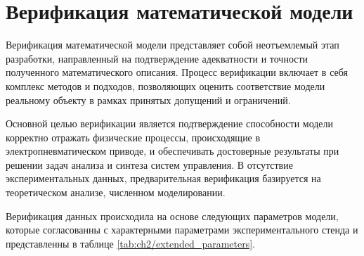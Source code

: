 
\section{Верификация математической модели}\label{sec:ch2/sec6}
Верификация математической модели  представляет собой неотъемлемый этап разработки, направленный на подтверждение адекватности
и точности полученного математического описания. Процесс верификации включает в себя комплекс методов и подходов,
позволяющих оценить соответствие модели реальному объекту в рамках принятых допущений и ограничений.

Основной целью верификации является подтверждение способности модели корректно отражать физические процессы,
происходящие в электропневматическом приводе, и обеспечивать достоверные результаты при решении задач анализа и синтеза систем управления.
В отсутствие экспериментальных данных, предварительная верификация базируется на теоретическом анализе,
численном моделировании.

Верификация данных происходила на основе следующих параметров модели, которые согласованны
с характерными параметрами экспериментального стенда и представленны в
таблице \ref{tab:ch2/extended_parameters}.

